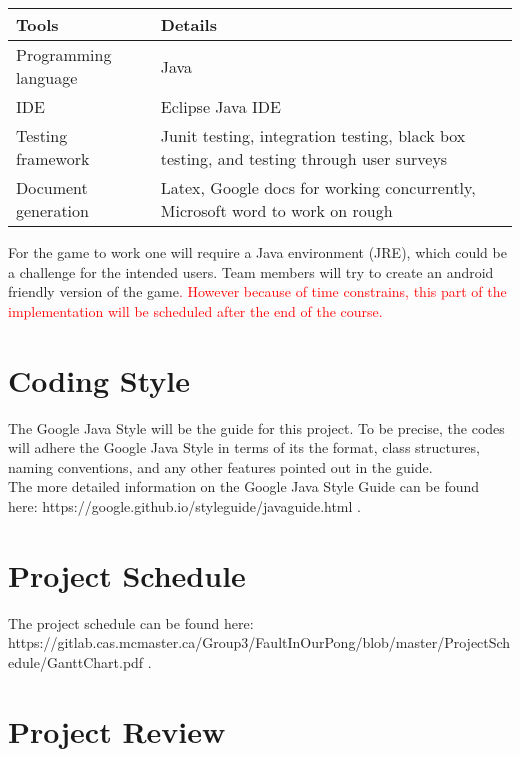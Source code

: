 \documentclass{article}
\begin{document}
\begin{tabular}{|p{5cm}|p{8cm}|}
\hline
\textbf{Tools}    & \textbf{Details}                                                                                                                                                                                                                                                                                                                                                                                                                                \\\hline
Programming language       & Java\\\hline
IDE      & Eclipse Java IDE\\\hline
Testing framework       & Junit testing, integration testing, black box testing, and testing through user surveys \\\hline
Document generation   & Latex, Google docs for working concurrently, Microsoft word to work on rough \\\hline
\end{tabular}\bigskip

For the game to work one will require a Java environment (JRE), which could be a challenge for the intended users. Team members will try to create an android friendly version of the game\textcolor{red}{. However because of time constrains, this part of 
the implementation will be scheduled after the end of the course.} \\

\section {Coding Style}
The Google Java Style will be the guide for this project. To be precise, the codes will adhere the Google Java Style in terms of its the format, class structures, naming conventions, and any other features pointed out in the guide.\\

The more detailed information on the Google Java Style Guide can be found here: https://google.github.io/styleguide/javaguide.html . \\


\section {Project Schedule}

The project schedule can be found here: \\
https://gitlab.cas.mcmaster.ca/Group3/FaultInOurPong/blob/master/ProjectSchedule/GanttChart.pdf . 


\section {Project Review} 
\end{document}
